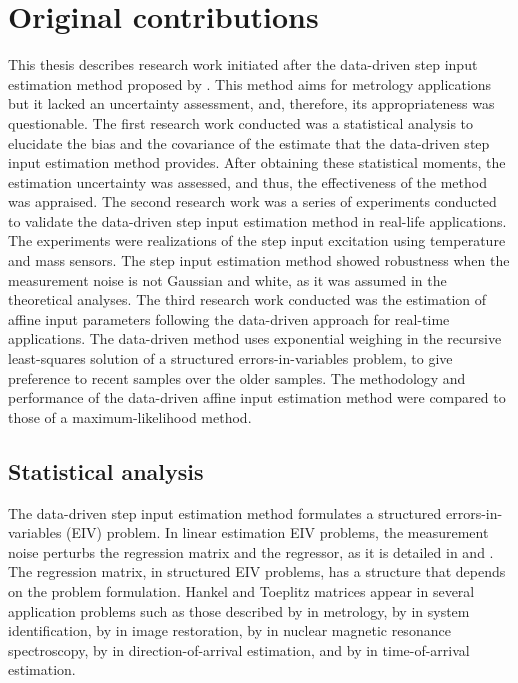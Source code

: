 \section{Original contributions}


This thesis describes research work initiated after the data-driven step input estimation method proposed by \citet{Markovsky15cep}.
This method aims for metrology applications but it lacked an uncertainty assessment, and, therefore, its appropriateness was questionable.
The first research work conducted was a statistical analysis to elucidate the bias and the covariance of the estimate that the data-driven step input estimation method provides.
After obtaining these statistical moments, the estimation uncertainty was assessed, and thus, the effectiveness of the method was appraised.
The second research work was a series of experiments conducted to validate the data-driven step input estimation method in real-life applications.
The experiments were realizations of the step input excitation using temperature and mass sensors.
The step input estimation method showed robustness when the measurement noise is not Gaussian and white, as it was assumed in the theoretical analyses.
The third research work conducted was the estimation of affine input parameters following the data-driven approach for real-time applications. 
The data-driven method uses exponential weighing in the recursive least-squares solution of a structured errors-in-variables problem, to give preference to recent samples over the older samples.
The methodology and performance of the data-driven affine input estimation method were compared to those of a maximum-likelihood method.

\subsection{Statistical analysis}

The data-driven step input estimation method formulates a structured errors-in-variables (EIV) problem.
In linear estimation EIV problems, the measurement noise perturbs the regression matrix and the regressor, as it is detailed in \citet{VanHuffel91Book} and \citet{Markovsky07overview}.
The regression matrix, in structured EIV problems, has a structure that depends on the problem formulation.
Hankel and Toeplitz matrices appear in several application problems such as those described by \citet{Markovsky15cep} in metrology, by \citet{Soderstrom07} in system identification, by \citet{Feiz17} in image restoration, by \citet{Cai16} in nuclear magnetic resonance spectroscopy, by \citet{Pan18} in direction-of-arrival estimation, and by \citet{Jia18} in time-of-arrival estimation.

